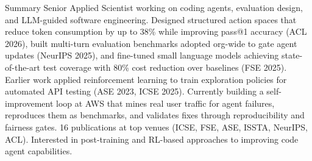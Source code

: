\documentclass{resume} %
\begin{document}

\begin{rSection}{Summary}
Senior Applied Scientist working on coding agents, evaluation design, and LLM-guided software engineering. Designed structured action spaces that reduce token consumption by up to 38\% while improving pass@1 accuracy (ACL 2026), built multi-turn evaluation benchmarks adopted org-wide to gate agent updates (NeurIPS 2025), and fine-tuned small language models achieving state-of-the-art test coverage with 80\% cost reduction over baselines (FSE 2025). Earlier work applied reinforcement learning to train exploration policies for automated API testing (ASE 2023, ICSE 2025). Currently building a self-improvement loop at AWS that mines real user traffic for agent failures, reproduces them as benchmarks, and validates fixes through reproducibility and fairness gates. 16 publications at top venues (ICSE, FSE, ASE, ISSTA, NeurIPS, ACL). Interested in post-training and RL-based approaches to improving code agent capabilities.
\end{rSection}

\end{document}
